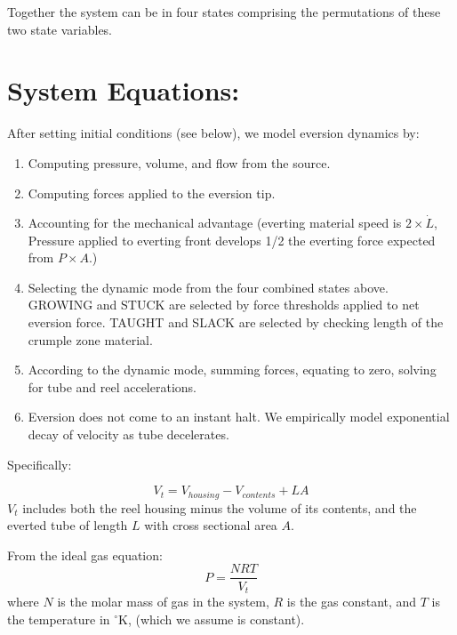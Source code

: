 \documentclass[letterpaper]{article}
\begin{document}
Together the system can be in four states comprising the permutations
of these two state variables.

\section{System Equations:}

After setting initial conditions (see below), we model eversion dynamics by:
\begin{enumerate}
  \item Computing pressure, volume, and flow from the source.
  \item Computing forces applied to the eversion tip.
  \item Accounting for the mechanical advantage (everting material speed is $2\times\dot{L}$, Pressure applied to everting front develops 1/2 the everting force expected from $P\times A$.)

  \item Selecting the dynamic mode from the four combined states above.
  GROWING and STUCK are selected by force thresholds applied to net
  eversion force.    TAUGHT and SLACK are selected by checking length of
  the crumple zone material.

  \item According to the dynamic mode, summing forces, equating to  zero, solving for tube and reel accelerations.
  \item Eversion does not come to an instant halt. We  empirically model exponential decay of velocity as tube decelerates.
\end{enumerate}

\noindent
Specifically:

\begin{equation}\label{eqOneCompartmentVol}
V_t = V_{housing} - V_{contents} + L  A
\end{equation}
$V_t$ includes both the reel housing minus the volume of its contents,
and the everted tube of length $L$ with cross sectional area $A$.

From the ideal gas equation:
\begin{equation}\label{eqOneCompartmentPress}
P = \frac{N  RT}{ V_t}
\end{equation}
where $N$ is the molar mass of gas in the system, $R$ is the gas constant, and $T$ is the temperature
in $^\circ$K, (which we assume is constant).
\end{document}
